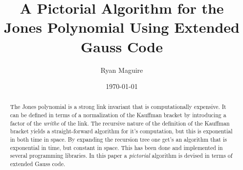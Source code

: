 \documentclass{article}
\title{A Pictorial Algorithm for the Jones Polynomial Using Extended Gauss Code}
\author{Ryan Maguire}
\date{\today}
\theoremstyle{plain}
\begin{document}
    \maketitle
    \tableofcontents
    \begin{abstract}
        \noindent
        The Jones polynomial is a strong link invariant that is computationally
        expensive. It can be defined in terms of a normalization of the Kauffman
        bracket by introducing a factor of the \textit{writhe} of the link.
        The recursive nature of the definition of the Kauffman bracket yields a
        straight-forward algorithm for it's computation, but this is
        exponential in both time in space. By expanding the recursion tree one
        get's an algorithm that is exponential in time, but constant in space.
        This has been done and implemented in several programming libraries.
        In this paper a \textit{pictorial} algorithm is devised in terms of
        extended Gauss code.
    \end{abstract}
\end{document}
